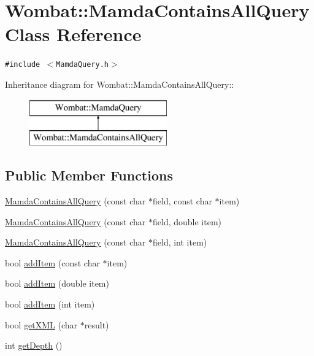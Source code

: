\hypertarget{classWombat_1_1MamdaContainsAllQuery}{
\section{Wombat::Mamda\-Contains\-All\-Query Class Reference}
\label{classWombat_1_1MamdaContainsAllQuery}
}
{\tt \#include $<$Mamda\-Query.h$>$}

Inheritance diagram for Wombat::Mamda\-Contains\-All\-Query::\begin{figure}[H]
\begin{center}
\leavevmode
\includegraphics[height=2cm]{classWombat_1_1MamdaContainsAllQuery}
\end{center}
\end{figure}
\subsection*{Public Member Functions}
\begin{CompactItemize}
\item 
\hyperlink{classWombat_1_1MamdaContainsAllQuery_845d1b617481ef88d7e8c72ad97bb5ee}{Mamda\-Contains\-All\-Query} (const char $\ast$field, const char $\ast$item)
\item 
\hyperlink{classWombat_1_1MamdaContainsAllQuery_90dbad50f39f29b1a9fe8a70f403cb55}{Mamda\-Contains\-All\-Query} (const char $\ast$field, double item)
\item 
\hyperlink{classWombat_1_1MamdaContainsAllQuery_541bef824d5bb2f2b02a7095a447d5c2}{Mamda\-Contains\-All\-Query} (const char $\ast$field, int item)
\item 
bool \hyperlink{classWombat_1_1MamdaContainsAllQuery_aa2c137302b6ee1bc13568ce3dd69d0e}{add\-Item} (const char $\ast$item)
\item 
bool \hyperlink{classWombat_1_1MamdaContainsAllQuery_59c1a8a697f61215b0f6644d309e1a58}{add\-Item} (double item)
\item 
bool \hyperlink{classWombat_1_1MamdaContainsAllQuery_ed4ddaf3ac9630af31be7daa74bb4885}{add\-Item} (int item)
\item 
bool \hyperlink{classWombat_1_1MamdaContainsAllQuery_b904ded6460672fe834c0f704576d50c}{get\-XML} (char $\ast$result)
\item 
int \hyperlink{classWombat_1_1MamdaContainsAllQuery_619fd4e1d11603e4e29926c0f2abf1cd}{get\-Depth} ()
\end{CompactItemize}


